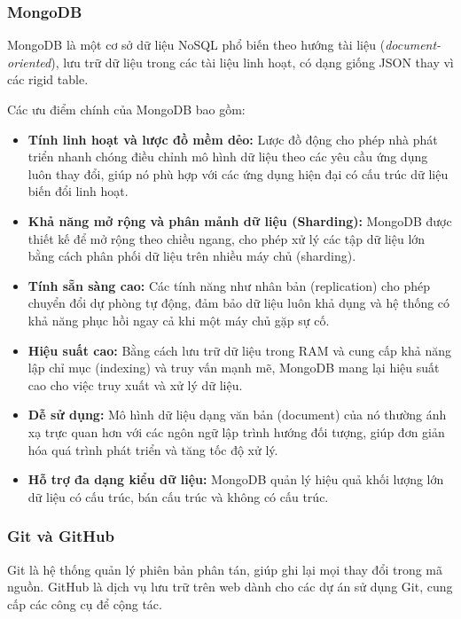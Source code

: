 \documentclass[a4paper, 15pt]{article}
\begin{document}
\subsubsection{MongoDB}

MongoDB là một cơ sở dữ liệu NoSQL phổ biến theo hướng tài liệu (\textit{document-oriented}), 
lưu trữ dữ liệu trong các tài liệu linh hoạt, có dạng giống JSON thay vì các rigid table. 

Các ưu điểm chính của MongoDB bao gồm:  

\begin{itemize}
    \item \textbf{Tính linh hoạt và lược đồ mềm dẻo:}  
    Lược đồ động cho phép nhà phát triển nhanh chóng điều chỉnh mô hình dữ liệu theo các yêu cầu ứng dụng luôn thay đổi, giúp nó phù hợp với các ứng dụng hiện đại có cấu trúc dữ liệu biến đổi linh hoạt.

    \item \textbf{Khả năng mở rộng và phân mảnh dữ liệu (Sharding):}  
    MongoDB được thiết kế để mở rộng theo chiều ngang, cho phép xử lý các tập dữ liệu lớn bằng cách phân phối dữ liệu trên nhiều máy chủ (sharding).

    \item \textbf{Tính sẵn sàng cao:}  
    Các tính năng như nhân bản (replication) cho phép chuyển đổi dự phòng tự động, đảm bảo dữ liệu luôn khả dụng và hệ thống có khả năng phục hồi ngay cả khi một máy chủ gặp sự cố.

    \item \textbf{Hiệu suất cao:}  
    Bằng cách lưu trữ dữ liệu trong RAM và cung cấp khả năng lập chỉ mục (indexing) và truy vấn mạnh mẽ, MongoDB mang lại hiệu suất cao cho việc truy xuất và xử lý dữ liệu.

    \item \textbf{Dễ sử dụng:}  
    Mô hình dữ liệu dạng văn bản (document) của nó thường ánh xạ trực quan hơn với các ngôn ngữ lập trình hướng đối tượng, giúp đơn giản hóa quá trình phát triển và tăng tốc độ xử lý.

    \item \textbf{Hỗ trợ đa dạng kiểu dữ liệu:}  
    MongoDB quản lý hiệu quả khối lượng lớn dữ liệu có cấu trúc, bán cấu trúc và không có cấu trúc.
\end{itemize}
\subsubsection{Git và GitHub}
Git là hệ thống quản lý phiên bản phân tán, giúp ghi lại mọi thay đổi trong mã nguồn. GitHub là dịch vụ lưu trữ trên web dành cho các dự án sử dụng Git, cung cấp các công cụ để cộng tác.
\end{document}
